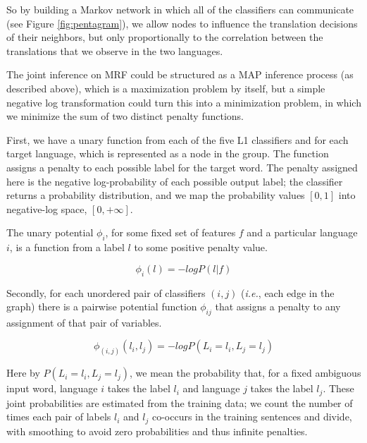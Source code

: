 \documentclass[11pt,letterpaper]{article}
\begin{document}
So by building a Markov network in which all of the classifiers can
communicate (see Figure \ref{fig:pentagram}), we allow nodes to influence the
translation decisions of their neighbors, but only proportionally to the
correlation between the translations that we observe in the two languages.


The joint inference on MRF could be structured as a MAP inference process (as described above),
which is a maximization problem by itself, but a simple negative log transformation could turn this into
a minimization problem, in which we minimize the sum of two distinct penalty functions.



First, we have a unary function from each of the five L1 classifiers and for
each target language, which is represented as a node in the group.  The
function assigns a penalty to each possible label for the target word.  The
penalty assigned here is the negative log-probability of each possible output
label; the classifier returns a probability distribution, and we map the
probability values $[0,1]$ into negative-log space, $[0, +\infty]$.

The unary potential $\phi_i$, for some fixed set of features $f$ and a
particular language $i$, is a function from a label $l$ to some positive
penalty value.

$$
\phi_i(l) = - log P(l | f)
$$

Secondly, for each unordered pair of classifiers $(i,j)$ (\emph{i.e.}, each
edge in the graph) there is a pairwise potential function $\phi_{ij}$ that
assigns a penalty to any assignment of that pair of variables.

$$
\phi_{(i,j)}(l_i, l_j) = - log P(L_i = l_i, L_j = l_j)
$$

Here by $P(L_i = l_i, L_j = l_j)$, we mean the probability that, for a fixed
ambiguous input word, language $i$ takes the label $l_i$ and language $j$ takes
the label $l_j$. These joint probabilities are estimated from the training
data; we count the number of times each pair of labels $l_i$ and $l_j$
co-occurs in the training sentences and divide, with smoothing to avoid zero
probabilities and thus infinite penalties.
\end{document}
